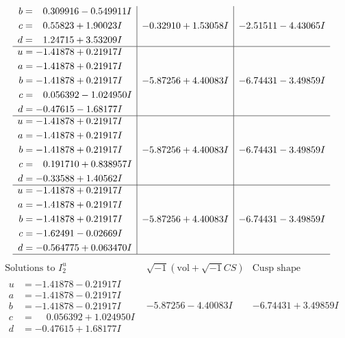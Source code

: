 \documentclass[1p]{elsarticle_modified}
\theoremstyle{definition}
\newcommand{\I}{\sqrt{-1}}
\begin{document}
$$\begin{array}{c|c|c}
\begin{aligned}
b &= \phantom{-}0.309916 - 0.549911 I \\
c &= \phantom{-}0.55823 + 1.90023 I \\
d &= \phantom{-}1.24715 + 3.53209 I\end{aligned}
 & -0.32910 + 1.53058 I & -2.51511 - 4.43065 I \\ \hline\begin{aligned}
u &= -1.41878 + 0.21917 I \\
a &= -1.41878 + 0.21917 I \\
b &= -1.41878 + 0.21917 I \\
c &= \phantom{-}0.056392 - 1.024950 I \\
d &= -0.47615 - 1.68177 I\end{aligned}
 & -5.87256 + 4.40083 I & -6.74431 - 3.49859 I \\ \hline\begin{aligned}
u &= -1.41878 + 0.21917 I \\
a &= -1.41878 + 0.21917 I \\
b &= -1.41878 + 0.21917 I \\
c &= \phantom{-}0.191710 + 0.838957 I \\
d &= -0.33588 + 1.40562 I\end{aligned}
 & -5.87256 + 4.40083 I & -6.74431 - 3.49859 I \\ \hline\begin{aligned}
u &= -1.41878 + 0.21917 I \\
a &= -1.41878 + 0.21917 I \\
b &= -1.41878 + 0.21917 I \\
c &= -1.62491 - 0.02669 I \\
d &= -0.564775 + 0.063470 I\end{aligned}
 & -5.87256 + 4.40083 I & -6.74431 - 3.49859 I\\
 \hline 
 \end{array}$$\newpage$$\begin{array}{c|c|c}  
\text{Solutions to }I^u_{2}& \I (\text{vol} + \sqrt{-1}CS) & \text{Cusp shape}\\
 \hline 
\begin{aligned}
u &= -1.41878 - 0.21917 I \\
a &= -1.41878 - 0.21917 I \\
b &= -1.41878 - 0.21917 I \\
c &= \phantom{-}0.056392 + 1.024950 I \\
d &= -0.47615 + 1.68177 I\end{aligned}
 & -5.87256 - 4.40083 I & -6.74431 + 3.49859 I \\ \hline\begin{aligned}

\end{aligned}
\end{array}$$
\end{document}
